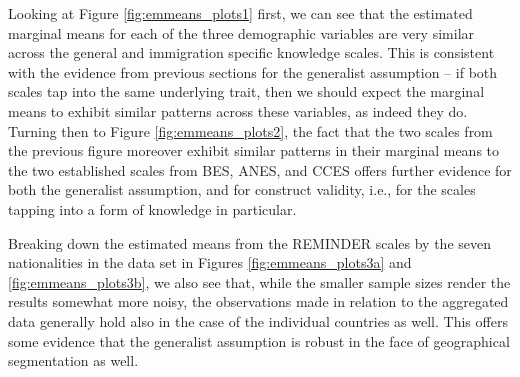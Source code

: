 \documentclass[11pt,halfline,a4paper,]{ouparticle}
\begin{document}
Looking at Figure \ref{fig:emmeans_plots1} first, we can see that the
estimated marginal means for each of the three demographic variables are
very similar across the general and immigration specific knowledge
scales. This is consistent with the evidence from previous sections for
the generalist assumption -- if both scales tap into the same underlying
trait, then we should expect the marginal means to exhibit similar
patterns across these variables, as indeed they do. Turning then to
Figure \ref{fig:emmeans_plots2}, the fact that the two scales from the
previous figure moreover exhibit similar patterns in their marginal
means to the two established scales from BES, ANES, and CCES offers
further evidence for both the generalist assumption, and for construct
validity, i.e., for the scales tapping into a form of knowledge in
particular.

Breaking down the estimated means from the REMINDER scales by the seven
nationalities in the data set in Figures \ref{fig:emmeans_plots3a} and
\ref{fig:emmeans_plots3b}, we also see that, while the smaller sample
sizes render the results somewhat more noisy, the observations made in
relation to the aggregated data generally hold also in the case of the
individual countries as well. This offers some evidence that the
generalist assumption is robust in the face of geographical segmentation
as well.
\end{document}

